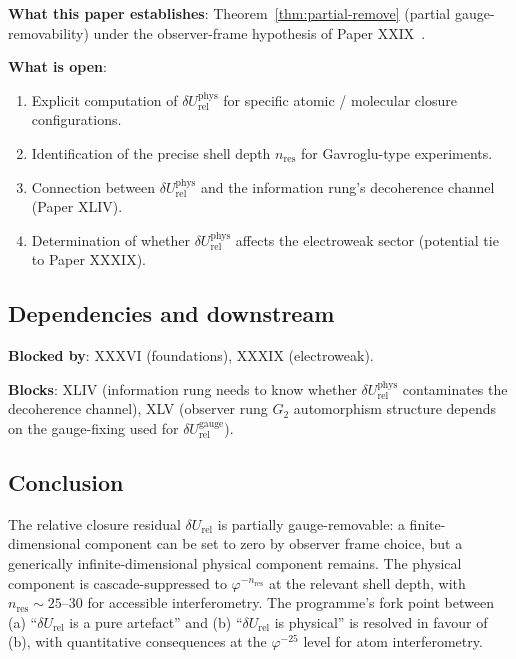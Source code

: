 \documentclass[12pt]{article}
\theoremstyle{definition}
\theoremstyle{remark}
\newcommand{\dUrel}{\delta U_{\mathrm{rel}}}
\begin{document}
\textbf{What this paper establishes}: Theorem~\ref{thm:partial-remove} (partial gauge-removability) under the observer-frame hypothesis of Paper XXIX~\citep{SmartXXIX}.

\textbf{What is open}:
\begin{enumerate}
\item Explicit computation of $\dUrel^{\mathrm{phys}}$ for specific atomic / molecular closure configurations.
\item Identification of the precise shell depth $n_{\mathrm{res}}$ for Gavroglu-type experiments.
\item Connection between $\dUrel^{\mathrm{phys}}$ and the information rung's decoherence channel (Paper XLIV).
\item Determination of whether $\dUrel^{\mathrm{phys}}$ affects the electroweak sector (potential tie to Paper XXXIX).
\end{enumerate}

\subsection{Dependencies and downstream}

\textbf{Blocked by}: XXXVI (foundations), XXXIX (electroweak).

\textbf{Blocks}: XLIV (information rung needs to know whether $\dUrel^{\mathrm{phys}}$ contaminates the decoherence channel), XLV (observer rung $G_2$ automorphism structure depends on the gauge-fixing used for $\dUrel^{\mathrm{gauge}}$).

\subsection{Conclusion}

The relative closure residual $\dUrel$ is partially gauge-removable: a finite-dimensional component can be set to zero by observer frame choice, but a generically infinite-dimensional physical component remains. The physical component is cascade-suppressed to $\varphi^{-n_{\mathrm{res}}}$ at the relevant shell depth, with $n_{\mathrm{res}} \sim 25$--$30$ for accessible interferometry. The programme's fork point between (a) ``$\dUrel$ is a pure artefact'' and (b) ``$\dUrel$ is physical'' is resolved in favour of (b), with quantitative consequences at the $\varphi^{-25}$ level for atom interferometry.
\end{document}
